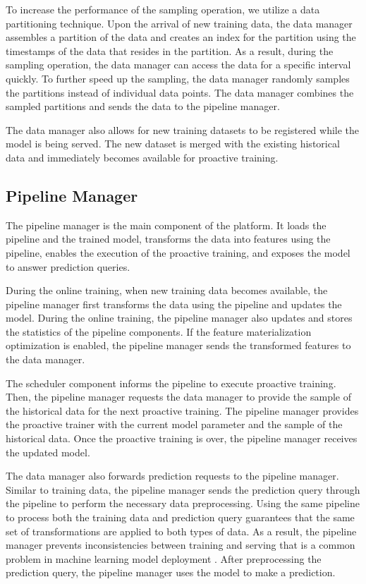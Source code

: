 To increase the performance of the sampling operation, we utilize a data partitioning technique.
Upon the arrival of new training data, the data manager assembles a partition of the data and creates an index for the partition using the timestamps of the data that resides in the partition.
As a result, during the sampling operation, the data manager can access the data for a specific interval quickly.
To further speed up the sampling, the data manager randomly samples the partitions instead of individual data points.
The data manager combines the sampled partitions and sends the data to the pipeline manager.

The data manager also allows for new training datasets to be registered while the model is being served.
The new dataset is merged with the existing historical data and immediately becomes available for proactive training.

\subsection{Pipeline Manager} \label{pipeline-manager} 
The pipeline manager is the main component of the platform.
It loads the pipeline and the trained model, transforms the data into features using the pipeline, enables the execution of the proactive training, and exposes the model to answer prediction queries.

During the online training, when new training data becomes available, the pipeline manager first transforms the data using the pipeline and updates the model.
During the online training, the pipeline manager also updates and stores the statistics of the pipeline components.
If the feature materialization optimization is enabled, the pipeline manager sends the transformed features to the data manager.

The scheduler component informs the pipeline to execute proactive training.
Then, the pipeline manager requests the data manager to provide the sample of the historical data for the next proactive training.
The pipeline manager provides the proactive trainer with the current model parameter and the sample of the historical data.
Once the proactive training is over, the pipeline manager receives the updated model.

The data manager also forwards prediction requests to the pipeline manager.
Similar to training data, the pipeline manager sends the prediction query through the pipeline to perform the necessary data preprocessing.
Using the same pipeline to process both the training data and prediction query guarantees that the same set of transformations are applied to both types of data.
As a result, the pipeline manager prevents inconsistencies between training and serving that is a common problem in machine learning model deployment \cite{baylor2017tfx}.
After preprocessing the prediction query, the pipeline manager uses the model to make a prediction.

